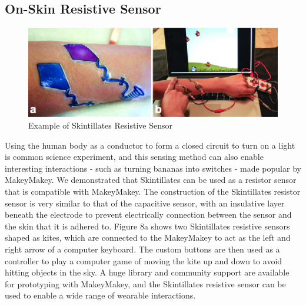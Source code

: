 \documentclass{sigchi}
\begin{document}
\subsection {On-Skin Resistive Sensor}
\begin{figure} [b!]
\centering
\includegraphics[width=1\columnwidth]{figures/Figure9}
\caption{Example of Skintillates Resistive Sensor}
\vspace{-8pt}
\label{fig:resisitve}
\end{figure}
Using the human body as a conductor to form a closed circuit to turn on a light is common science experiment, and this sensing method can also enable interesting interactions - such as turning bananas into switches - made popular by MakeyMakey. We demonstrated that Skintillates can be used as a resistor sensor that is compatible with MakeyMakey. The construction of the Skintillates resistor sensor is very similar to that of the capacitive sensor, with an insulative layer beneath the electrode to prevent electrically connection between the sensor and the skin that it is adhered to. Figure 8a shows two Skintillates resistive sensors shaped as kites, which are connected to the MakeyMakey to act as the left and right arrow of a computer keyboard. The custom buttons are then used as a controller to play a computer game of moving the kite up and down to avoid hitting objects in the sky. A huge library and community support are available for prototyping with MakeyMakey, and the Skintillates resistive sensor can be used to enable a wide range of wearable interactions. 
\end{document}
